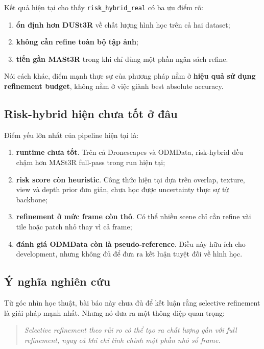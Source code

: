 \documentclass[11pt,a4paper]{article}
\begin{document}
Kết quả hiện tại cho thấy \texttt{risk\_hybrid\_real} có ba ưu điểm rõ:
\begin{enumerate}[leftmargin=1.5em]
  \item \textbf{ổn định hơn DUSt3R} về chất lượng hình học trên cả hai dataset;
  \item \textbf{không cần refine toàn bộ tập ảnh};
  \item \textbf{tiến gần MASt3R} trong khi chỉ dùng một phần ngân sách refine.
\end{enumerate}

Nói cách khác, điểm mạnh thực sự của phương pháp nằm ở \textbf{hiệu quả sử dụng refinement budget}, không nằm ở việc giành best absolute accuracy.

\subsection{Risk-hybrid hiện chưa tốt ở đâu}

Điểm yếu lớn nhất của pipeline hiện tại là:
\begin{enumerate}[leftmargin=1.5em]
  \item \textbf{runtime chưa tốt}. Trên cả Dronescapes và ODMData, risk-hybrid đều chậm hơn MASt3R full-pass trong run hiện tại;
  \item \textbf{risk score còn heuristic}. Công thức hiện tại dựa trên overlap, texture, view và depth prior đơn giản, chưa học được uncertainty thực sự từ backbone;
  \item \textbf{refinement ở mức frame còn thô}. Có thể nhiều scene chỉ cần refine vài tile hoặc patch nhỏ thay vì cả frame;
  \item \textbf{đánh giá ODMData còn là pseudo-reference}. Điều này hữu ích cho development, nhưng không đủ để đưa ra kết luận tuyệt đối về hình học.
\end{enumerate}

\subsection{Ý nghĩa nghiên cứu}

Từ góc nhìn học thuật, bài báo này chưa đủ để kết luận rằng selective refinement là giải pháp mạnh nhất. Nhưng nó đưa ra một thông điệp quan trọng:
\begin{quote}
\textit{Selective refinement theo rủi ro có thể tạo ra chất lượng gần với full refinement, ngay cả khi chỉ tinh chỉnh một phần nhỏ số frame.}
\end{quote}
\end{document}
